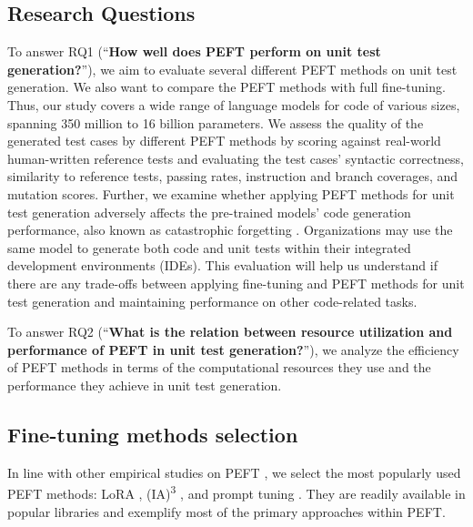 \documentclass[12pt]{book}
\begin{document}
\subsection{Research Questions}
To answer RQ1 (``\textbf{How well does PEFT perform on unit test generation?}''), we aim to evaluate several different PEFT methods on unit test generation. We also want to compare the PEFT methods with full fine-tuning. Thus, our study covers a wide range of language models for code of various sizes, spanning 350 million to 16 billion parameters. We assess the quality of the generated test cases by different PEFT methods by scoring against real-world human-written reference tests and evaluating the test cases' syntactic correctness, similarity to reference tests, passing rates, instruction and branch coverages, and mutation scores. Further, we examine whether applying PEFT methods for unit test generation adversely affects the pre-trained models' code generation performance, also known as catastrophic forgetting \citep{French1999CatastrophicFI, Luo2023AnES}. Organizations may use the same model to generate both code and unit tests within their integrated development environments (IDEs). This evaluation will help us understand if there are any trade-offs between applying fine-tuning and PEFT methods for unit test generation and maintaining performance on other code-related tasks.

To answer RQ2 (``\textbf{What is the relation between resource utilization and performance of PEFT in unit test generation?}''), we analyze the efficiency of PEFT methods in terms of the computational resources they use and the performance they achieve in unit test generation. 

\subsection{Fine-tuning methods selection}
In line with other empirical studies on PEFT \citep{weyssow2024exploring, Pu2023EmpiricalAO}, we select the most popularly used PEFT methods: LoRA \citep{Yu2023LowRankAO}, (IA)\textsuperscript{3} \citep{Liu2022FewShotPF}, and prompt tuning \citep{Lester2021ThePO}. They are readily available in popular libraries and exemplify most of the primary approaches within PEFT. 
\end{document}
